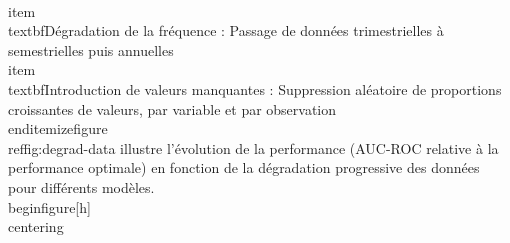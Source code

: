 \\item \\textbf{Dégradation de la fréquence} : Passage de données trimestrielles à semestrielles puis annuelles\n    \n    \\item \\textbf{Introduction de valeurs manquantes} : Suppression aléatoire de proportions croissantes de valeurs, par variable et par observation\n\\end{itemize}\n\nLa figure \\ref{fig:degrad-data} illustre l'évolution de la performance (AUC-ROC relative à la performance optimale) en fonction de la dégradation progressive des données pour différents modèles.\n\n\\begin{figure}[h]\n\\centering\n%